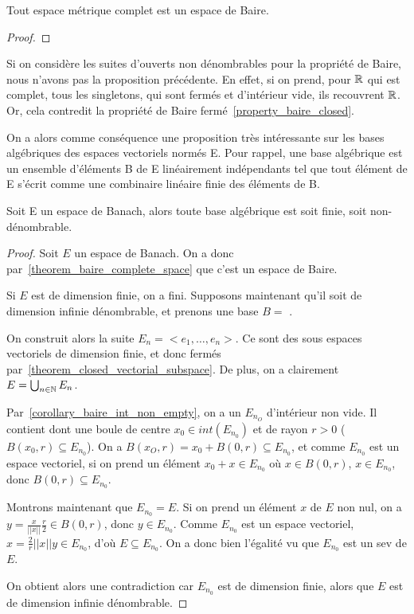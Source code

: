 \begin{theorem} 
\label{theorem_baire_complete_space}
	Tout espace métrique complet est un espace de Baire.
\end{theorem}

\begin{proof}
	
\end{proof}

\begin{remarque}
	Si on considère les suites d'ouverts non dénombrables pour la propriété de
	Baire, nous n'avons pas la proposition précédente.
	En effet, si on prend, pour $\mathbb{R}$ qui est complet, tous les singletons,
	qui sont fermés et d'intérieur vide, ils recouvrent $\mathbb{R}$. Or, cela
	contredit la propriété de Baire fermé~\ref{property_baire_closed}.
\end{remarque}

On a alors comme conséquence une proposition très intéressante sur les bases
algébriques des espaces vectoriels normés E. Pour rappel, une base algébrique
est un ensemble d'éléments B de E linéairement indépendants tel que tout élément
de E s'écrit comme une combinaire linéaire finie des éléments de B.

\begin{proposition}
\label{proposition_basis_banach_space}
	Soit E un espace de Banach, alors toute base algébrique est soit finie, soit
	non-dénombrable.
\end{proposition}

\begin{proof}
	Soit $E$ un espace de Banach. On a donc
	par~\ref{theorem_baire_complete_space} que c'est un espace de Baire.

	Si $E$ est de dimension finie, on a fini.
	Supposons maintenant qu'il soit de dimension infinie dénombrable, et prenons
	une base $B = $ .

	On construit alors la suite $E_{n} = <e_{1}, \ldots, e_{n}>$. Ce sont des
	sous espaces vectoriels de dimension finie, et donc fermés
	par~\ref{theorem_closed_vectorial_subspace}. De plus, on a
	clairement $E = \bigcup_{n \in \mathbb{N}} E_{n}$.

	Par~\ref{corollary_baire_int_non_empty}, on a un $E_{n_{O}}$ d'intérieur non
	vide. Il contient dont une boule de centre $x_{0} \in int({E_{n_{0}}})$ et
	de rayon $r > 0$ ($B(x_{0}, r) \subseteq E_{n_{0}}$).
	On a $B(x_{O}, r) = x_{0} + B(0, r) \subseteq E_{n_{0}}$, et comme
	$E_{n_{0}}$ est un espace vectoriel, si on prend un élément $x_{0} + x \in
	E_{n_{0}}$ où $x \in B(0, r)$, $x \in E_{n_{0}}$, donc $B(0, r) \subseteq
	E_{n_{0}}$.

	Montrons maintenant que $E_{n_{0}} = E$. Si on prend un élément $x$ de $E$
	non nul, on a $y = \frac{x}{||x||} \frac{r}{2} \in B(0, r)$, donc $y \in
	E_{n_{0}}$. Comme $E_{n_{0}}$ est un espace vectoriel, $x = \frac{2}{r}
	||x|| y \in E_{n_{0}}$, d'où $E \subseteq E_{n_{0}}$. On a donc bien
	l'égalité vu que $E_{n_{0}}$ est un sev de $E$.

	On obtient alors une contradiction car $E_{n_{0}}$ est de dimension finie,
	alors que $E$ est de dimension infinie dénombrable.
\end{proof}

